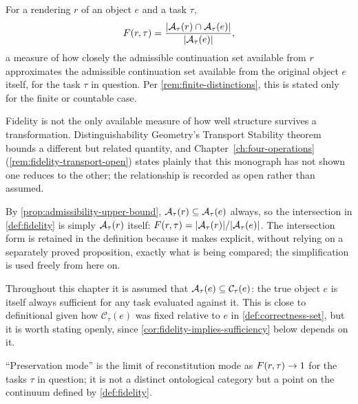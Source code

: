\begin{definition}[Fidelity]
\label{def:fidelity}
For a rendering $r$ of an object $e$ and a task $\tau$,
\[
F(r,\tau) = \frac{\lvert \mathcal{A}_{\tau}(r) \cap \mathcal{A}_{\tau}(e)
\rvert}{\lvert \mathcal{A}_{\tau}(e) \rvert},
\]
a measure of how closely the admissible continuation set available from
$r$ approximates the admissible continuation set available from the
original object $e$ itself, for the task $\tau$ in question. Per
\cref{rem:finite-distinctions}, this is stated only for the finite or
countable case.
\end{definition}

\begin{remark}
\label{rem:fidelity-transport-pointer}
Fidelity is not the only available measure of how well structure survives a
transformation. Distinguishability Geometry's Transport Stability theorem
bounds a different but related quantity, and Chapter~\ref{ch:four-operations}
(\cref{rem:fidelity-transport-open}) states plainly that this monograph has
not shown one reduces to the other; the relationship is recorded as open
rather than assumed.
\end{remark}

\begin{remark}
\label{rem:fidelity-simplifies}
By \cref{prop:admissibility-upper-bound}, $\mathcal{A}_{\tau}(r) \subseteq
\mathcal{A}_{\tau}(e)$ always, so the intersection in \cref{def:fidelity} is
simply $\mathcal{A}_{\tau}(r)$ itself:
$F(r,\tau) = \lvert\mathcal{A}_{\tau}(r)\rvert / \lvert\mathcal{A}_{\tau}(e)\rvert$.
The intersection form is retained in the definition because it makes
explicit, without relying on a separately proved proposition, exactly
what is being compared; the simplification is used freely from here on.
\end{remark}

\begin{remark}
\label{rem:ground-truth-sufficiency}
Throughout this chapter it is assumed that $\mathcal{A}_{\tau}(e) \subseteq
\mathcal{C}_\tau(e)$: the true object $e$ is itself always sufficient for
any task evaluated against it. This is close to definitional given how
$\mathcal{C}_\tau(e)$ was fixed relative to $e$ in
\cref{def:correctness-set}, but it is worth stating openly, since
\cref{cor:fidelity-implies-sufficiency} below depends on it.
\end{remark}

\begin{proposition}
\label{prop:preservation-limit}
``Preservation mode'' is the limit of reconstitution mode as
$F(r,\tau) \to 1$ for the tasks $\tau$ in question; it is not a
distinct ontological category but a point on the continuum defined by
\cref{def:fidelity}.
\end{proposition}

